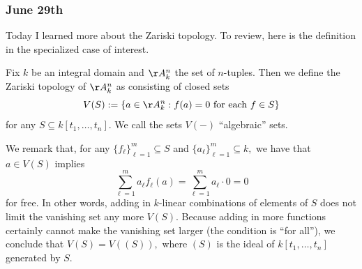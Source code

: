 \subsubsection{June 29th}
Today I learned more about the Zariski topology. To review, here is the definition in the specialized case of interest.
\begin{definition}
    Fix $k$ be an integral domain and $\AA_k^n$ the set of $n$-tuples. Then we define the Zariski topology of $\AA_k^n$ as consisting of closed sets
    \[V(S):=\left\{a\in\AA_k^n:f(a)=0\text{ for each }f\in S\right\}\]
    for any $S\subseteq k[t_1,\ldots,t_n].$ We call the sets $V(-)$ ``algebraic'' sets.
\end{definition}
We remark that, for any $\{f_\ell\}_{\ell=1}^m\subseteq S$ and $\{a_\ell\}_{\ell=1}^m\subseteq k,$ we have that $a\in V(S)$ implies
\[\sum_{\ell=1}^ma_\ell f_\ell(a)=\sum_{\ell=1}^ma_\ell\cdot0=0\]
for free. In other words, adding in $k$-linear combinations of elements of $S$ does not limit the vanishing set any more $V(S).$ Because adding in more functions certainly cannot make the vanishing set larger (the condition is ``for all''), we conclude that $V(S)=V((S)),$ where $(S)$ is the ideal of $k[t_1,\ldots,t_n]$ generated by $S.$


